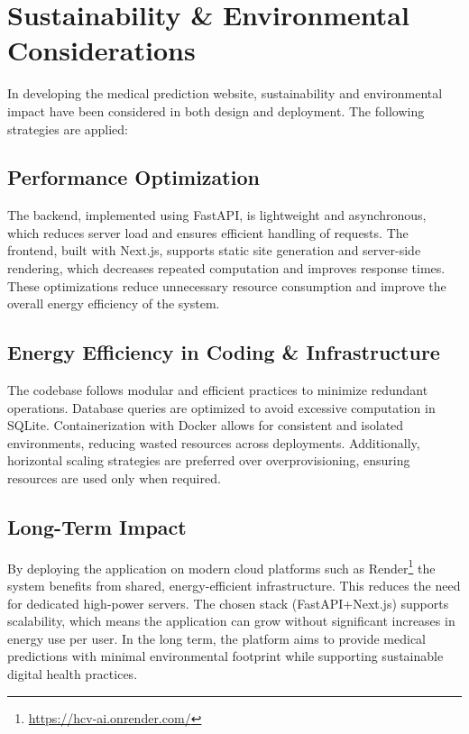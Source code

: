 \section{Sustainability \& Environmental Considerations}

In developing the medical prediction website, sustainability and environmental 
impact have been considered in both design and deployment. The following strategies are applied:

\subsection*{Performance Optimization}
The backend, implemented using FastAPI, is lightweight and asynchronous,
which reduces server load and ensures efficient handling of requests.
The frontend, built with Next.js, supports static site generation and
server-side rendering, which decreases repeated computation and improves
response times. These optimizations reduce unnecessary resource consumption
and improve the overall energy efficiency of the system.

\subsection*{Energy Efficiency in Coding \& Infrastructure}
The codebase follows modular and efficient practices to minimize redundant operations.
Database queries are optimized to avoid excessive computation in SQLite.
Containerization with Docker allows for consistent and isolated environments,
reducing wasted resources across deployments. Additionally, horizontal scaling strategies
are preferred over overprovisioning, ensuring resources are used only when required.

\subsection*{Long-Term Impact}
By deploying the application on modern cloud platforms such as Render\footnote{\url{https://hcv-ai.onrender.com/}}
the system benefits from shared, energy-efficient infrastructure.
This reduces the need for dedicated high-power servers.
The chosen stack (FastAPI+Next.js) supports scalability, which means the application
can grow without significant increases in energy use per user.
In the long term, the platform aims to provide medical predictions with minimal environmental
footprint while supporting sustainable digital health practices.

